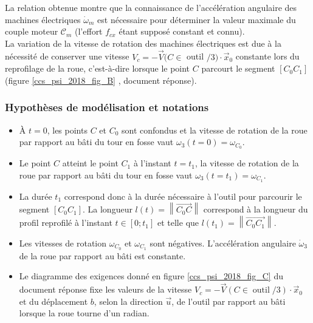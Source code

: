 


La relation obtenue montre que la connaissance de l'accélération angulaire des machines électriques $\dot{\omega}_{m}$ est nécessaire pour déterminer la valeur maximale du couple moteur $\mathcal{C}_{m}$ (l'effort $f_{c x}$ étant supposé constant et connu).\\
La variation de la vitesse de rotation des machines électriques est due à la nécessité de conserver une vitesse $V_{c}=-\vec{V}(C \in$ outil $/ 3) \cdot \vec{x}_{0}$ constante lors du reprofilage de la roue, c'est-à-dire lorsque le point $C$ parcourt le segment $\left[C_{0} C_{1}\right]$ (figure \ref{ccs_psi_2018_fig_B} , document réponse).

\subsubsection*{Hypothèses de modélisation et notations}
\begin{itemize}
  \item À $t=0$, les points $C$ et $C_{0}$ sont confondus et la vitesse de rotation de la roue par rapport au bâti du tour en fosse vaut $\omega_{3}(t=0)=\omega_{C_{0}}$.
  \item Le point $C$ atteint le point $C_{1}$ à l'instant $t=t_{1}$, la vitesse de rotation de la roue par rapport au bâti du tour en fosse vaut $\omega_{3}\left(t=t_{1}\right)=\omega_{C_{1}}$.
  \item La durée $t_{1}$ correspond donc à la durée nécessaire à l'outil pour parcourir le segment $\left[C_{0} C_{1}\right]$. La longueur $l(t)=\left\|\overrightarrow{C_{0} C}\right\|$ correspond à la longueur du profil reprofilé à l'instant $t \in\left[0 ; t_{1}\right]$ et telle que $l\left(t_{1}\right)=\left\|\overrightarrow{C_{0} C_{1}}\right\|$.
  \item Les vitesses de rotation $\omega_{C_{0}}$ et $\omega_{C_{1}}$ sont négatives. L'accélération angulaire $\dot{\omega}_{3}$ de la roue par rapport au bâti est constante.
  \item Le diagramme des exigences donné en figure \ref{ccs_psi_2018_fig_C} du document réponse fixe les valeurs de la vitesse $V_{c}= -\vec{V}(C \in \operatorname{outil} / 3) \cdot \vec{x}_{0}$ et du déplacement $b$, selon la direction $\vec{u}$, de l'outil par rapport au bâti lorsque la roue tourne d'un radian.\\
\end{itemize}

